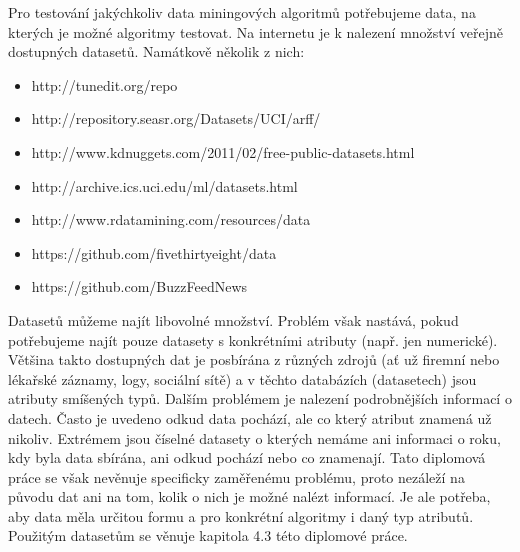 \documentclass[12pt]{article}
\begin{document}
Pro testování jakýchkoliv data miningových algoritmů potřebujeme data, na kterých je možné algoritmy testovat. Na internetu je k nalezení množství veřejně dostupných datasetů. Namátkově několik z nich:
\begin{itemize}
\item http://tunedit.org/repo
\item http://repository.seasr.org/Datasets/UCI/arff/
\item http://www.kdnuggets.com/2011/02/free-public-datasets.html
\item http://archive.ics.uci.edu/ml/datasets.html
\item http://www.rdatamining.com/resources/data
\item https://github.com/fivethirtyeight/data
\item https://github.com/BuzzFeedNews
\end{itemize}
Datasetů můžeme najít libovolné množství. Problém však nastává, pokud potřebujeme najít pouze datasety s konkrétními atributy (např. jen numerické). Většina takto dostupných dat je posbírána z různých zdrojů (ať už firemní nebo lékařské záznamy, logy, sociální sítě) a v těchto databázích (datasetech) jsou atributy smíšených typů. Dalším problémem je nalezení podrobnějších informací o datech. Často je uvedeno odkud data pochází, ale co který atribut znamená už nikoliv. Extrémem jsou číselné datasety o kterých nemáme ani informaci o roku, kdy byla data sbírána, ani odkud pochází nebo co znamenají.
\newline
\indent
Tato diplomová práce se však nevěnuje specificky zaměřenému problému, proto nezáleží na původu dat ani na tom, kolik o nich je možné nalézt informací. Je ale potřeba, aby data měla určitou formu a pro konkrétní algoritmy i daný typ atributů. Použitým datasetům se věnuje kapitola 4.3 této diplomové práce.
 
\end{document}
